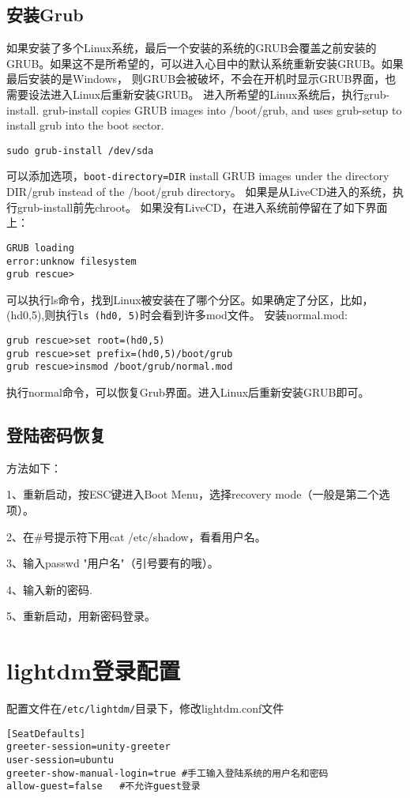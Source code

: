 \subsection{安装Grub}
如果安装了多个Linux系统，最后一个安装的系统的GRUB会覆盖之前安装的GRUB。如果这不是所希望的，可以进入心目中的默认系统重新安装GRUB。如果最后安装的是Windows，
则GRUB会被破坏，不会在开机时显示GRUB界面，也需要设法进入Linux后重新安装GRUB。
进入所希望的Linux系统后，执行grub-install. grub-install copies GRUB images into /boot/grub, and uses grub-setup to install grub into the boot sector.
\begin{verbatim}
sudo grub-install /dev/sda
\end{verbatim}
可以添加选项，\verb+boot-directory=DIR+
install GRUB images under the directory DIR/grub instead of the /boot/grub directory。
如果是从LiveCD进入的系统，执行grub-install前先chroot。
如果没有LiveCD，在进入系统前停留在了如下界面上：
\begin{verbatim}
GRUB loading
error:unknow filesystem
grub rescue>
\end{verbatim}
可以执行ls命令，找到Linux被安装在了哪个分区。如果确定了分区，比如，(hd0,5),则执行\verb+ls (hd0, 5)+时会看到许多mod文件。
安装normal.mod:
\begin{verbatim}
grub rescue>set root=(hd0,5)
grub rescue>set prefix=(hd0,5)/boot/grub
grub rescue>insmod /boot/grub/normal.mod
\end{verbatim}
执行normal命令，可以恢复Grub界面。进入Linux后重新安装GRUB即可。


\subsection{登陆密码恢复}
方法如下：

1、重新启动，按ESC键进入Boot Menu，选择recovery mode（一般是第二个选项）。

2、在\#号提示符下用cat /etc/shadow，看看用户名。

3、输入passwd "用户名"（引号要有的哦）。

4、输入新的密码.

5、重新启动，用新密码登录。 
\section{lightdm登录配置}
配置文件在\verb+/etc/lightdm/+目录下，修改lightdm.conf文件
\begin{verbatim}
[SeatDefaults]
greeter-session=unity-greeter
user-session=ubuntu
greeter-show-manual-login=true #手工输入登陆系统的用户名和密码
allow-guest=false   #不允许guest登录
\end{verbatim}


